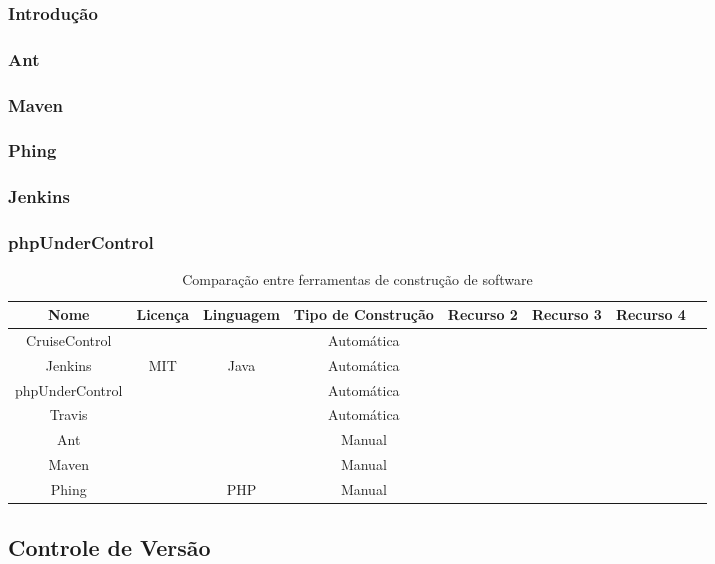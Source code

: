 \documentclass[12pt,a4paper]{article}
\begin{document}
		\subsubsection{Introdução}
		\subsubsection{Ant}
		\subsubsection{Maven}
		\subsubsection{Phing}
		\subsubsection{Jenkins}
		\subsubsection{phpUnderControl}
		
		\begin{table}[h]
			\tabcolsep=0.11cm
			\begin{tabular}{|c|c|c|c|c|c|c|c|}
			\hline Nome 			& Licença 	& Linguagem & Tipo de Construção 	& Recurso 2 & Recurso 3 & Recurso 4  \\
			\hline  CruiseControl	&  			&  			& Automática			&  			&  			&  			\\
			\hline  Jenkins			& MIT		& Java		& Automática			&  			&  			&  			\\
			\hline  phpUnderControl	&  			&  			& Automática 			&  			&  			&  			\\ 
			\hline  Travis			&  			&  			& Automática			&  			&  			&  			\\ 
			\hline  Ant				&  			&  			& Manual				&  			&  			&  			\\ 
			\hline  Maven			&  			&  			& Manual				&  			&  			&  			\\ 
			\hline  Phing			&  			& PHP		& Manual				&  			&  			&  			\\
			\hline  
			\end{tabular} 
			\caption{Comparação entre ferramentas de construção de software}
		\end{table}
		
	\subsection{Controle de Versão}
\end{document}
